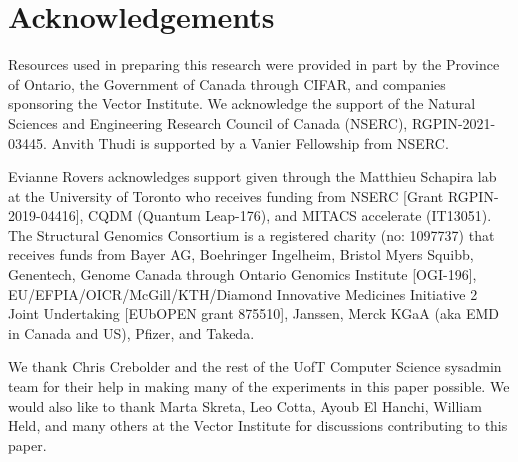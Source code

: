 \section*{Acknowledgements}

Resources used in preparing this research were provided in part by the Province of Ontario, the Government of Canada through CIFAR, and companies sponsoring the Vector Institute. We acknowledge the support of the Natural Sciences and Engineering Research Council of Canada (NSERC), RGPIN-2021-03445. Anvith Thudi is supported by a Vanier Fellowship from NSERC.

Evianne Rovers acknowledges support given through the Matthieu Schapira lab at the University of Toronto who receives funding from NSERC [Grant RGPIN-2019-04416], CQDM (Quantum Leap-176), and MITACS accelerate (IT13051). The Structural Genomics Consortium is a registered charity (no: 1097737) that receives funds from Bayer AG, Boehringer Ingelheim, Bristol Myers Squibb, Genentech, Genome Canada through Ontario Genomics Institute [OGI-196], EU/EFPIA/OICR/McGill/KTH/Diamond Innovative Medicines Initiative 2 Joint Undertaking [EUbOPEN grant 875510], Janssen, Merck KGaA (aka EMD in Canada and US), Pfizer, and Takeda. 

We thank Chris Crebolder and the rest of the UofT Computer Science sysadmin team for their help in making many of the experiments in this paper possible. We would also like to thank Marta Skreta, Leo Cotta, Ayoub El Hanchi, William Held, and many others at the Vector Institute for discussions contributing to this paper.
